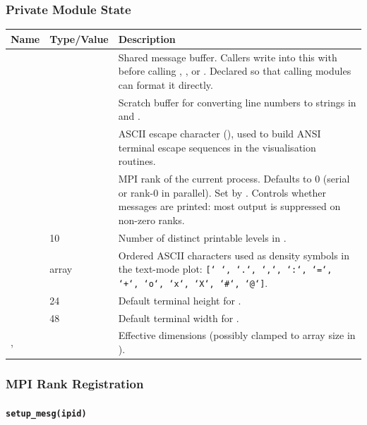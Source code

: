 \subsubsection{Private Module State}

\begin{longtable}{L{4cm} L{3cm} L{7cm}}
  \toprule
  \textbf{Name} & \textbf{Type/Value} & \textbf{Description} \\
  \midrule
  \endhead
  \bottomrule
  \endfoot
      &  &
    Shared message buffer. Callers write into this with 
    before calling , , or . Declared
     so that calling modules can format it directly. \\
      &  &
    Scratch buffer for converting line numbers to strings in 
    and . \\
        &  &
    ASCII escape character (), used to build ANSI terminal
    escape sequences in the visualisation routines. \\
     &  &
    MPI rank of the current process. Defaults to 0 (serial or rank-0 in
    parallel). Set by . Controls whether messages are
    printed: most output is suppressed on non-zero ranks. \\
    & 10 & Number of distinct printable levels in
    . \\
   &  array &
    Ordered ASCII characters used as density symbols in the text-mode plot:
    \texttt{[` `, `.`, `,`, `:`, `=`, `+`, `o`, `x`, `X`, `\#`, `@`]}. \\
       & 24 & Default terminal height for . \\
       & 48 & Default terminal width for . \\
  ,  & & Effective dimensions (possibly clamped to
    array size in ). \\
\end{longtable}

\subsubsection{MPI Rank Registration}

\paragraph{\texttt{setup\_mesg(ipid)}}

